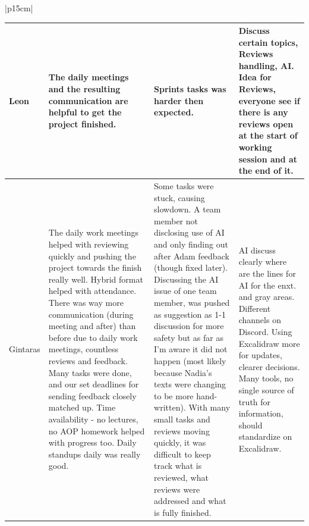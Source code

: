 \begin{table}[H]
    \centering
    \begin{tabular}{|p{15cm}|} 
        \hline
        \begin{table}[H]
            \begin{tabular}{|p{1.75cm}|p{4cm}|p{4cm}|p{4cm}|}
                \hline
                \cellcolor[HTML]{d4d4d4} Leon & The daily meetings and the resulting communication are helpful to get the project finished. & Sprints tasks was harder then expected. & Discuss certain topics, Reviews handling, AI. \newline Idea for Reviews, everyone see if there is any reviews open at the start of working session and at the end of it. \\
                \hline  
                \cellcolor[HTML]{d4d4d4} Gintaras & The daily work meetings helped with reviewing quickly and pushing the project towards the finish really well. Hybrid format helped with attendance. There was way more communication (during meeting and after) than before due to daily work meetings, countless reviews and feedback. Many tasks were done, and our set deadlines for sending feedback closely matched up. Time availability - no lectures, no AOP homework helped with progress too. Daily standups daily was really good. & Some tasks were stuck, causing slowdown. A team member not disclosing use of AI and only finding out after Adam feedback (though fixed later). Discussing the AI issue of one team member, was pushed as suggestion as 1-1 discussion for more safety but as far as I'm aware it did not happen (most likely because Nadia's texts were changing to be more hand-written). With many small tasks and reviews moving quickly, it was difficult to keep track what is reviewed, what reviews were addressed and what is fully finished. & AI discuss clearly where are the lines for AI for the enxt. and gray areas. Different channels on Discord. Using Excalidraw more for updates, clearer decisions. Many tools, no single source of truth for information, should standardize on Excalidraw. \\
                \hline
            \end{tabular}
        \end{table}
        \\
        \hline
    \end{tabular}
\end{table}

